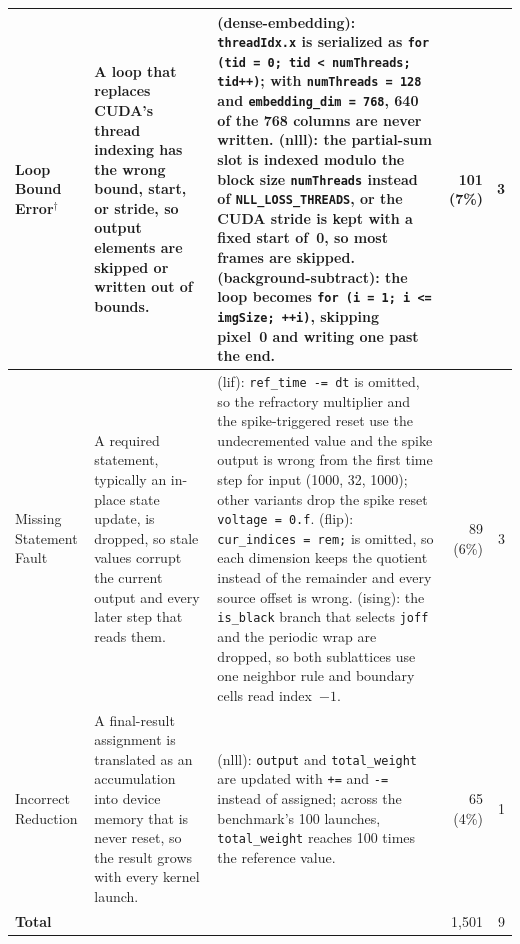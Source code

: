 \begin{table}[!t]
\begin{tabular}{@{}>{\raggedright\arraybackslash}p{2.1cm}>{\raggedright\arraybackslash}p{4.4cm}>{\raggedright\arraybackslash}p{8.0cm}rr@{}}
\midrule
Loop Bound Error$^\dagger$ & A loop that replaces CUDA's thread indexing has the wrong bound, start, or stride, so output elements are skipped or written out of bounds. & (dense-embedding): \texttt{threadIdx.x} is serialized as \texttt{for (tid = 0; tid < numThreads; tid++)}; with \texttt{numThreads = 128} and \texttt{embedding\_dim = 768}, 640 of the 768 columns are never written. (nlll): the partial-sum slot is indexed modulo the block size \texttt{numThreads} instead of \texttt{NLL\_LOSS\_THREADS}, or the CUDA stride is kept with a fixed start of~0, so most frames are skipped. (background-subtract): the loop becomes \texttt{for (i = 1; i <= imgSize; ++i)}, skipping pixel~0 and writing one past the end. & 101 (7\%) & 3 \\
\midrule
Missing Statement Fault & A required statement, typically an in-place state update, is dropped, so stale values corrupt the current output and every later step that reads them. & (lif): \texttt{ref\_time -= dt} is omitted, so the refractory multiplier and the spike-triggered reset use the undecremented value and the spike output is wrong from the first time step for input (1000, 32, 1000); other variants drop the spike reset \texttt{voltage = 0.f}. (flip): \texttt{cur\_indices = rem;} is omitted, so each dimension keeps the quotient instead of the remainder and every source offset is wrong. (ising): the \texttt{is\_black} branch that selects \texttt{joff} and the periodic wrap are dropped, so both sublattices use one neighbor rule and boundary cells read index~$-1$. & 89 (6\%) & 3 \\
\midrule
Incorrect Reduction & A final-result assignment is translated as an accumulation into device memory that is never reset, so the result grows with every kernel launch. & (nlll): \texttt{output} and \texttt{total\_weight} are updated with \texttt{+=} and \texttt{-=} instead of assigned; across the benchmark's 100 launches, \texttt{total\_weight} reaches 100 times the reference value. & 65 (4\%) & 1 \\
\midrule
\textbf{Total} & & & 1{,}501 & 9 \\
\bottomrule
\end{tabular}
\end{table}
